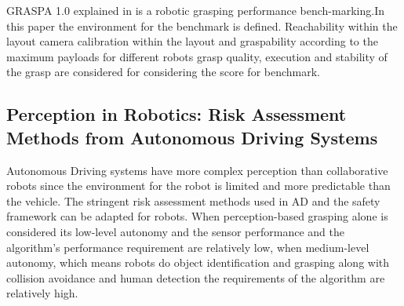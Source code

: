 {GRASPA 1.0 explained in \cite{author23}is a robotic grasping performance bench-marking.In this paper the environment for the benchmark is defined. Reachability within the layout camera calibration within the layout and  graspability according to the maximum payloads for different robots grasp quality, execution and stability of the grasp are considered for considering the score for benchmark.

 \subsection{\RaggedRight Perception in Robotics: Risk Assessment Methods from Autonomous Driving Systems}{\normalfont\fontsize{14}{16}\bfseries} %

Autonomous Driving systems have more complex perception than collaborative robots since the environment for the robot is limited and more predictable than the vehicle. The stringent risk assessment methods used in AD and the safety framework can be adapted for robots.
When perception-based grasping alone is considered its low-level autonomy and the sensor performance and the algorithm's performance requirement are relatively low, when medium-level autonomy, which means robots do object identification and grasping along with collision avoidance and human detection the requirements of the algorithm are relatively high. 

}
